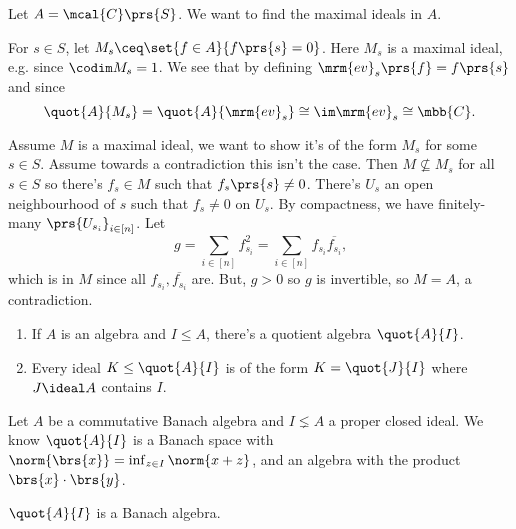 \documentclass[10pt, twoside]{book}
\begin{document}
\begin{example}
Let $A = \mcal{C}\prs{S}$. We want to find the maximal ideals in $A$.

For $s \in S$, let $M_s \ceq \set{f \in A}{f\prs{s} = 0}$.
Here $M_s$ is a maximal ideal, e.g. since $\codim M_s = 1$. We see that by defining $\mrm{ev}_s\prs{f} = f\prs{s}$ and since \[\quot{A}{M_s} = \quot{A}{\mrm{ev}_s} \cong \im \mrm{ev}_s \cong \mbb{C} \text{.}\]

Assume $M$ is a maximal ideal, we want to show it's of the form $M_s$ for some $s \in S$.
Assume towards a contradiction this isn't the case. Then $M \nsubseteq M_s$ for all $s \in S$ so there's $f_s \in M$ such that $f_s\prs{s} \neq 0$. There's $U_s$ an open neighbourhood of $s$ such that $f_s \neq 0$ on $U_s$. By compactness, we have finitely-many $\prs{U_{s_i}}_{i \in [n]}$. Let
\[g = \sum_{i \in [n]} f_{s_i}^2 = \sum_{i \in [n]} f_{s_i} \overline{f_{s_i}} \text{,}\]
which is in $M$ since all $f_{s_i}, \overline{f_{s_i}}$ are.
But, $g > 0$ so $g$ is invertible, so $M = A$, a contradiction.
\end{example}

\begin{fact}
\begin{enumerate}
\item If $A$ is an algebra and $I \leq A$, there's a quotient algebra $\quot{A}{I}$. 
\item Every ideal $K \leq \quot{A}{I}$ is of the form $K = \quot{J}{I}$ where $J \ideal A$ contains $I$.
\end{enumerate}
\end{fact}


\begin{fact}
Let $A$ be a commutative Banach algebra and $I \lneq A$ a proper closed ideal. We know $\quot{A}{I}$ is a Banach space with $\norm{\brs{x}} = \inf_{z \in I} \norm{x+z}$, and an algebra with the product $\brs{x} \cdot \brs{y}$.
\end{fact}

\begin{proposition}
$\quot{A}{I}$ is a Banach algebra.
\end{proposition}
\end{document}
